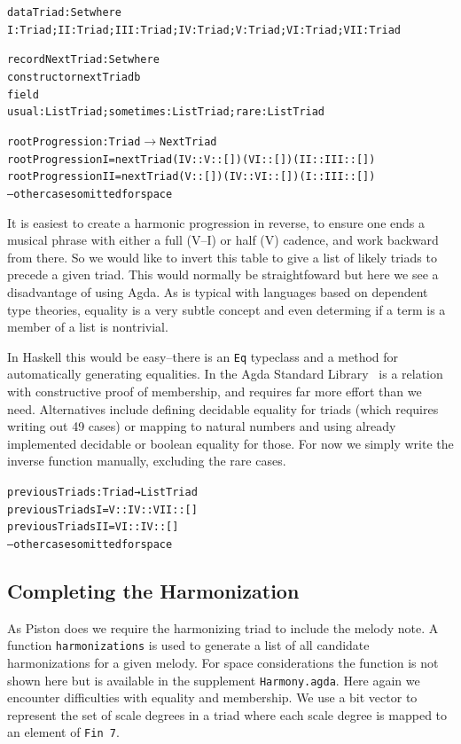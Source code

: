 \begin{alltt}
data Triad : Set where
  I : Triad; II : Triad; III : Triad; IV : Triad; V : Triad; VI : Triad; VII : Triad

record NextTriad : Set where
  constructor nextTriadb
  field
    usual : List Triad; sometimes : List Triad; rare : List Triad

rootProgression : Triad \(\rightarrow\) NextTriad
rootProgression I   = nextTriad (IV :: V :: []) (VI :: []) (II :: III :: [])
rootProgression II  = nextTriad (V :: []) (IV  :: VI :: []) (I :: III :: [])
-- other cases omitted for space
\end{alltt}

It is easiest to create a harmonic progression in reverse, to
ensure one ends a musical phrase with either a full (V--I) or half (V)
cadence, and work backward from there. So we would like to invert this
table to give a list of likely triads to precede a given triad. This
would normally be straightfoward but here we see a disadvantage of
using Agda. As is typical with languages based on dependent type
theories, equality is a very subtle concept and even determing if a
term is a member of a list is nontrivial.

In Haskell this would be easy--there is an \texttt{Eq} typeclass and a
method for automatically generating equalities. In the Agda Standard
Library~\citep{agda-stdlib} is a relation with constructive proof of
membership, and requires far more effort than we need. Alternatives
include defining decidable equality for triads (which requires writing
out 49 cases) or mapping to natural numbers and using already
implemented decidable or boolean equality for those. For now we simply
write the inverse function manually, excluding the rare cases.

\begin{alltt}
previousTriads : Triad → List Triad
previousTriads I   = V :: IV :: VII :: []
previousTriads II  = VI :: IV :: []
-- other cases omitted for space
\end{alltt}

\subsection{Completing the Harmonization}
\label{sec:harmony:complete}

As Piston does we require the harmonizing triad to include the melody
note. A function \texttt{harmonizations} is used to generate a list of
all candidate harmonizations for a given melody. For space
considerations the function is not shown here but is available in the
supplement \texttt{Harmony.agda}. Here again we encounter difficulties
with equality and membership. We use a bit vector to represent the
set of scale degrees in a triad where each scale degree is mapped to
an element of \texttt{Fin 7}.

